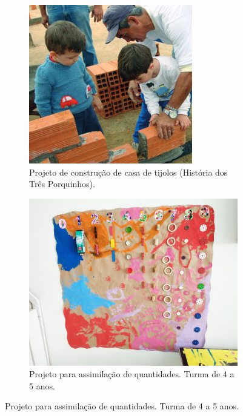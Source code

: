 \begin{figure}[!h]
    \centering
    \begin{subfigure}{.45\linewidth}
        \includegraphics[width=.8\linewidth,fbox]{figs/tres_porquinhos.png}
        \caption{Projeto de construção de casa de tijolos (História dos Três Porquinhos).}
        \label{fig:tres_porquinhos}
    \end{subfigure}%
    \hspace{.05\textwidth}%
    \begin{subfigure}{.45\textwidth}
        \includegraphics[width=.8\linewidth,fbox]{figs/projeto_numeros_menor.jpeg}
        \caption{Projeto para assimilação de quantidades. Turma de 4 a 5 anos.}
        \label{fig:projeto_numeros}
    \end{subfigure}%
\end{figure}
